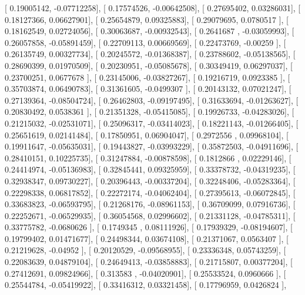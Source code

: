 \documentclass{article}
\begin{document}
       [ 0.19005142, -0.07712258],
       [ 0.17574526, -0.00642508],
       [ 0.27695402,  0.03286031],
       [ 0.18127366,  0.06627901],
       [ 0.25654879,  0.09325883],
       [ 0.29079695,  0.0780517 ],
       [ 0.18162549,  0.02724056],
       [ 0.30063687, -0.00932543],
       [ 0.2641687 , -0.03059993],
       [ 0.26057858, -0.05891459],
       [ 0.22709113,  0.00669569],
       [ 0.22473769, -0.00259   ],
       [ 0.26135749,  0.00327734],
       [ 0.20245572, -0.01368387],
       [ 0.23788602, -0.05138565],
       [ 0.28690399,  0.01970509],
       [ 0.20230951, -0.05085678],
       [ 0.30349419,  0.06297037],
       [ 0.23700251,  0.0677678 ],
       [ 0.23145006, -0.03827267],
       [ 0.19216719,  0.0923385 ],
       [ 0.35703874,  0.06490783],
       [ 0.31361605, -0.0499307 ],
       [ 0.20143132,  0.07021247],
       [ 0.27139364, -0.08504724],
       [ 0.26462803, -0.09197495],
       [ 0.31633694, -0.01263627],
       [ 0.20830492,  0.0538361 ],
       [ 0.21351328, -0.05415085],
       [ 0.19926733, -0.04283026],
       [ 0.21215032, -0.02531071],
       [ 0.25096317, -0.03414023],
       [ 0.18221143, -0.01266405],
       [ 0.25651619,  0.02141484],
       [ 0.17850951,  0.06904047],
       [ 0.2972556 ,  0.09968104],
       [ 0.19911647, -0.05635031],
       [ 0.19443827, -0.03993229],
       [ 0.35872503, -0.04911696],
       [ 0.28410151,  0.10225735],
       [ 0.31247884, -0.00878598],
       [ 0.1812866 ,  0.02229146],
       [ 0.24414974, -0.05136983],
       [ 0.32845441,  0.09325959],
       [ 0.33378732, -0.04319235],
       [ 0.32938347,  0.09730227],
       [ 0.20396443, -0.00337204],
       [ 0.32248406, -0.05283364],
       [ 0.22298338,  0.06817852],
       [ 0.22272174, -0.04062404],
       [ 0.27395613, -0.06072845],
       [ 0.33683823, -0.06593795],
       [ 0.21268176, -0.08961153],
       [ 0.36709099,  0.07916736],
       [ 0.22252671, -0.06529935],
       [ 0.36054568,  0.02996602],
       [ 0.21331128, -0.04785311],
       [ 0.33775782, -0.0680626 ],
       [ 0.1749345 ,  0.08111926],
       [ 0.17939329, -0.08194607],
       [ 0.19799402,  0.01471677],
       [ 0.24498344,  0.03674108],
       [ 0.21371067,  0.0563407 ],
       [ 0.21219628, -0.04952   ],
       [ 0.20120529, -0.09568955],
       [ 0.23336348,  0.05743259],
       [ 0.22083639,  0.04879104],
       [ 0.24649413, -0.03858883],
       [ 0.21715807,  0.00377204],
       [ 0.27412691,  0.09824966],
       [ 0.313583  , -0.04020901],
       [ 0.25533524,  0.0960666 ],
       [ 0.25544784, -0.05419922],
       [ 0.33416312,  0.03321458],
       [ 0.17796959,  0.0426824 ],
\end{document}
